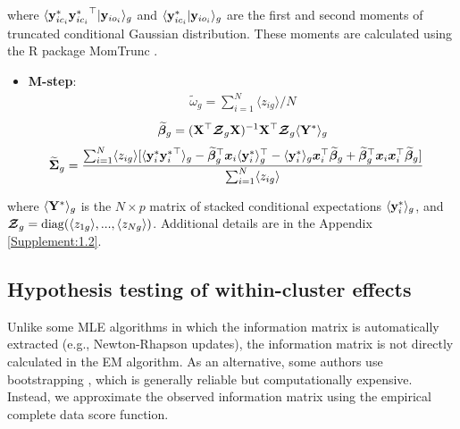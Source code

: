 \documentclass{interact}
\theoremstyle{plain}
\theoremstyle{definition}
\theoremstyle{remark}
\begin{document}
where 
$\langle \mathbf{y}_{ic_{i}}^* {\mathbf{y}_{ic_{i}}^*}^\top|\mathbf{y}_{io_{i}}\rangle_g$ 
and 
$\langle \mathbf{y}_{ic_{i}}^*|\mathbf{y}_{io_{i}}\rangle_g$
are the first and second moments of truncated conditional Gaussian distribution. These moments are calculated using the R package MomTrunc \citep{Galarza2021}.
\begin{itemize}
    \item \textbf{M-step}:
    \begin{align}
 \widetilde{\omega}_g=\sum_{i=1}^N \langle z_{ig} \rangle/N
    \end{align}
    \begin{align}
    \begin{split}
    \widetilde{{\bm \beta}}_g
    =(\mathbf{X}^\top\boldsymbol{\mathcal{Z}}_g\mathbf{X})^{-1}\mathbf{X}^\top\boldsymbol{\mathcal{Z}}_g\langle \mathbf{Y}^*\rangle_g
    \end{split}
    \end{align}
    \begin{align}
    \begin{split}
    \widetilde{\bm{\Sigma}}_g&=\frac{\sum_{i=1}^N\langle z_{ig} \rangle[\langle\mathbf{y}_i^*{\mathbf{y}_i^*}^\top\rangle_g-\widetilde{{\bm \beta}}_g^\top\bm{x}_i\langle{\mathbf{y}_i^*}\rangle_g^\top-\langle\mathbf{y}_i^*\rangle_g\bm{x}_i^\top\widetilde{{\bm \beta}}_g+\widetilde{{\bm \beta}}_g^\top\bm{x}_i\bm{x}_i^\top\widetilde{{\bm \beta}}_g]}{\sum_{i=1}^N\langle z_{ig} \rangle}
    \end{split}
    \end{align}
\end{itemize}
where $\langle{\mathbf{Y}^*}\rangle_g$ is the $N \times p$ matrix of stacked conditional expectations $\langle{\mathbf{y}_i^*}\rangle_g$, and $\boldsymbol{\mathcal{Z}}_g=\mathrm{diag}(\langle z_{1g} \rangle,...,\langle z_{Ng} \rangle)$.  Additional details are in the Appendix \ref{Supplement:1.2}.

\subsection{Hypothesis testing of within-cluster effects}
\label{s:inf}
Unlike some MLE algorithms in which the information matrix is automatically extracted (e.g., Newton-Rhapson updates), the information matrix is not directly calculated in the EM algorithm. As an alternative, some authors use bootstrapping \citep{McLachlan2000,OHagan2019}, which is generally reliable but computationally expensive. Instead, we approximate the observed information matrix using the empirical complete data score function. 
\end{document}
